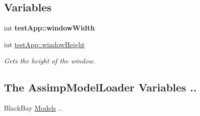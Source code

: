 \subsection*{Variables}
\begin{DoxyCompactItemize}
\item 
\hypertarget{group___int_variables_ga9ed611377cd46f5148a3a3d538e96484}{int {\bfseries test\-App\-::window\-Width}}\label{group___int_variables_ga9ed611377cd46f5148a3a3d538e96484}

\item 
int \hyperlink{group___int_variables_ga31efaa85f8a900bb659a537d56c73e03}{test\-App\-::window\-Height}
\begin{DoxyCompactList}\small\item\em Gets the height of the window. \end{DoxyCompactList}\end{DoxyCompactItemize}
\subsection*{The Assimp\-Model\-Loader Variables ..}
\label{_amgrpf861e8362b5cbec480d32986cd9c6e19}%
Black\-Bay \hyperlink{class_models}{Models} ..

